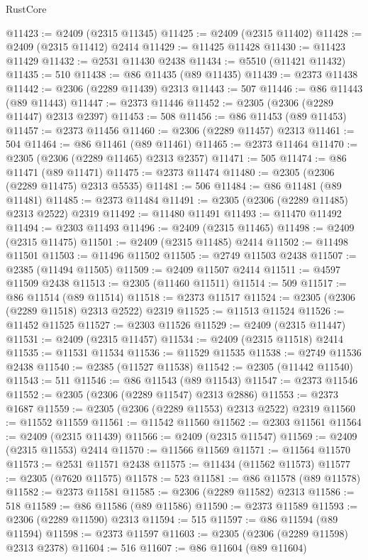 \begin{lexlean}{RustCore}
\begin{coremodule}
@11423 := @2409 (@2315 @11345)
@11425 := @2409 (@2315 @11402)
@11428 := @2409 (@2315 @11412) @2414
@11429 := @11425 @11428
@11430 := @11423 @11429
@11432 := @2531 @11430 @2438
@11434 := @5510 (@11421 @11432)
@11435 := 510
@11438 := @86 @11435 (@89 @11435)
@11439 := @2373 @11438
@11442 := @2306 (@2289 @11439) @2313
@11443 := 507
@11446 := @86 @11443 (@89 @11443)
@11447 := @2373 @11446
@11452 := @2305 (@2306 (@2289 @11447) @2313 @2397)
@11453 := 508
@11456 := @86 @11453 (@89 @11453)
@11457 := @2373 @11456
@11460 := @2306 (@2289 @11457) @2313
@11461 := 504
@11464 := @86 @11461 (@89 @11461)
@11465 := @2373 @11464
@11470 := @2305 (@2306 (@2289 @11465) @2313 @2357)
@11471 := 505
@11474 := @86 @11471 (@89 @11471)
@11475 := @2373 @11474
@11480 := @2305 (@2306 (@2289 @11475) @2313 @5535)
@11481 := 506
@11484 := @86 @11481 (@89 @11481)
@11485 := @2373 @11484
@11491 := @2305 (@2306 (@2289 @11485) @2313 @2522) @2319
@11492 := @11480 @11491
@11493 := @11470 @11492
@11494 := @2303 @11493
@11496 := @2409 (@2315 @11465)
@11498 := @2409 (@2315 @11475)
@11501 := @2409 (@2315 @11485) @2414
@11502 := @11498 @11501
@11503 := @11496 @11502
@11505 := @2749 @11503 @2438
@11507 := @2385 (@11494 @11505)
@11509 := @2409 @11507 @2414
@11511 := @4597 @11509 @2438
@11513 := @2305 (@11460 @11511)
@11514 := 509
@11517 := @86 @11514 (@89 @11514)
@11518 := @2373 @11517
@11524 := @2305 (@2306 (@2289 @11518) @2313 @2522) @2319
@11525 := @11513 @11524
@11526 := @11452 @11525
@11527 := @2303 @11526
@11529 := @2409 (@2315 @11447)
@11531 := @2409 (@2315 @11457)
@11534 := @2409 (@2315 @11518) @2414
@11535 := @11531 @11534
@11536 := @11529 @11535
@11538 := @2749 @11536 @2438
@11540 := @2385 (@11527 @11538)
@11542 := @2305 (@11442 @11540)
@11543 := 511
@11546 := @86 @11543 (@89 @11543)
@11547 := @2373 @11546
@11552 := @2305 (@2306 (@2289 @11547) @2313 @2886)
@11553 := @2373 @1687
@11559 := @2305 (@2306 (@2289 @11553) @2313 @2522) @2319
@11560 := @11552 @11559
@11561 := @11542 @11560
@11562 := @2303 @11561
@11564 := @2409 (@2315 @11439)
@11566 := @2409 (@2315 @11547)
@11569 := @2409 (@2315 @11553) @2414
@11570 := @11566 @11569
@11571 := @11564 @11570
@11573 := @2531 @11571 @2438
@11575 := @11434 (@11562 @11573)
@11577 := @2305 (@7620 @11575)
@11578 := 523
@11581 := @86 @11578 (@89 @11578)
@11582 := @2373 @11581
@11585 := @2306 (@2289 @11582) @2313
@11586 := 518
@11589 := @86 @11586 (@89 @11586)
@11590 := @2373 @11589
@11593 := @2306 (@2289 @11590) @2313
@11594 := 515
@11597 := @86 @11594 (@89 @11594)
@11598 := @2373 @11597
@11603 := @2305 (@2306 (@2289 @11598) @2313 @2378)
@11604 := 516
@11607 := @86 @11604 (@89 @11604)

\end{coremodule}
\end{lexlean}
